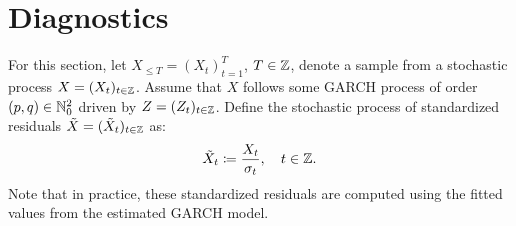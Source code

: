 \section{Diagnostics}
For this section, let $X_{\leq T}=(X_{t})_{t=1}^{T}$, $T\in\mathbb{Z}$, denote a sample from a stochastic process $X=(X_{t})_{t\in\mathbb{Z}}$. Assume that $X$ follows some GARCH process of order $(p,q)\in\mathbb{N}_{0}^{2}$ driven by $Z=(Z_{t})_{t\in\mathbb{Z}}$. Define the stochastic process of standardized residuals $\tilde{X}=(\tilde{X}_{t})_{t\in\mathbb{Z}}$ as:
\begin{equation}\label{eq:defn-stdresid}
    \tilde{X}_{t}\coloneqq\frac{X_{t}}{\sigma_{t}},\quad t\in\mathbb{Z}.
\end{equation}
Note that in practice, these standardized residuals are computed using the fitted values from the estimated GARCH model.


